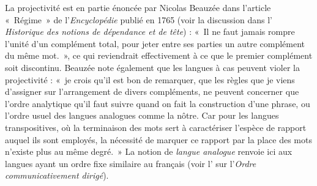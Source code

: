 La projectivité est en partie énoncée par Nicolas Beauzée dans l’article «~Régime~» de l’\textit{Encyclopédie} publié en 1765 (voir la discussion dans l’ \textit{Historique des notions de dépendance et de tête}) : «~Il ne faut jamais rompre l’unité d’un complément total, pour jeter entre ses parties un autre complément du même mot.~», ce qui reviendrait effectivement à ce que le premier complément soit discontinu. Beauzée note également que les langues à cas peuvent violer la projectivité : «~je crois qu’il est bon de remarquer, que les règles que je viens d’assigner sur l’arrangement de divers compléments, ne peuvent concerner que l’ordre analytique qu’il faut suivre quand on fait la construction d’une phrase, ou l’ordre usuel des langues analogues comme la nôtre. Car pour les langues transpositives, où la terminaison des mots sert à caractériser l’espèce de rapport auquel ils sont employés, la nécessité de marquer ce rapport par la place des mots n’existe plus au même degré.~» La notion de \textit{langue analogue} renvoie ici aux langues ayant un ordre fixe similaire au français (voir l’ sur l’\textit{Ordre communicativement dirigé}).

